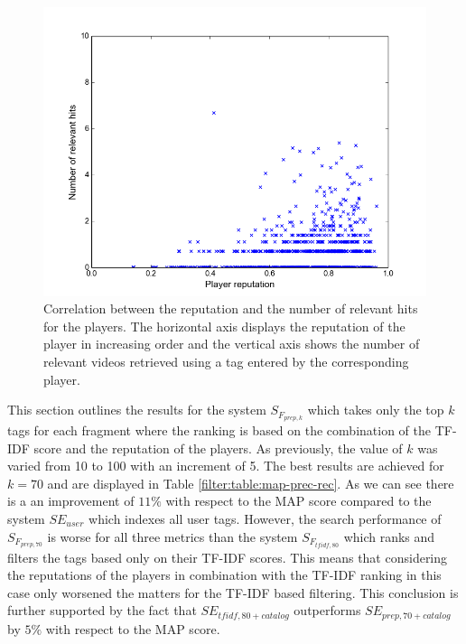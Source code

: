 \begin{figure}
\centering
\includegraphics[scale=.4]{filterrepcorr}
\caption{Correlation between the reputation and the number of relevant hits for the players. The horizontal axis displays the reputation of the player in increasing order and the vertical axis shows the number of relevant videos retrieved using a tag entered by the corresponding player.}
\label{filter:fig:repcorr}
\end{figure}

This section outlines the results for the system $S_{F_{prep,k}}$ which takes only the top $k$ tags for each fragment where the ranking is based on the combination of the TF-IDF score and the reputation of the players.
As previously, the value of $k$ was varied from 10 to 100 with an increment of 5.
The best results are achieved for $k=70$ and are displayed in Table \ref{filter:table:map-prec-rec}. As we can see there is a an improvement of $11\%$ with respect to the MAP score compared to the system $SE_{user}$ which indexes all user tags. However, the search performance of  $S_{F_{prep,70}}$ is worse for all three metrics than the system $S_{F_{tfidf,80}}$ which ranks and filters the tags based only on their TF-IDF scores. This means that considering the reputations of the players in combination with the TF-IDF ranking in this case only worsened the matters for the TF-IDF based filtering. This conclusion is further supported by the fact that $SE_{tfidf,80 + catalog}$ outperforms  $SE_{prep,70 + catalog}$ by $5\%$ with respect to the MAP score. 
